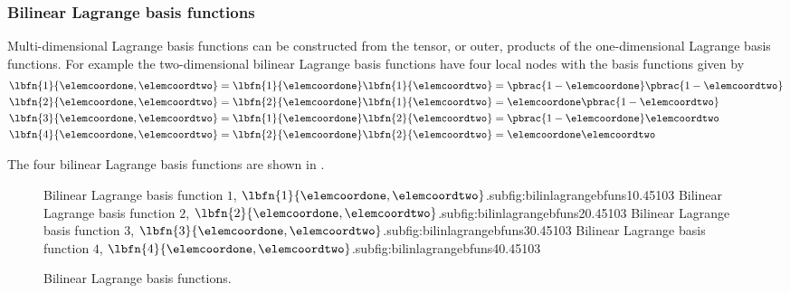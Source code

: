\subsubsection{Bilinear Lagrange basis functions}

Multi-dimensional Lagrange basis functions can be constructed from the tensor,
or outer, products of the one-dimensional Lagrange basis functions. For
example the two-dimensional bilinear Lagrange basis functions have four local
nodes with the basis functions given by
\begin{equation}
  \begin{split}
    \lbfn{1}{\elemcoordone,\elemcoordtwo}&=\lbfn{1}{\elemcoordone}\lbfn{1}{\elemcoordtwo}=
    \pbrac{1-\elemcoordone}\pbrac{1-\elemcoordtwo}\\
    \lbfn{2}{\elemcoordone,\elemcoordtwo}&=\lbfn{2}{\elemcoordone}\lbfn{1}{\elemcoordtwo}=
    \elemcoordone\pbrac{1-\elemcoordtwo}\\
    \lbfn{3}{\elemcoordone,\elemcoordtwo}&=\lbfn{1}{\elemcoordone}\lbfn{2}{\elemcoordtwo}=
    \pbrac{1-\elemcoordone}\elemcoordtwo \\
    \lbfn{4}{\elemcoordone,\elemcoordtwo}&=\lbfn{2}{\elemcoordone}\lbfn{2}{\elemcoordtwo}=
    \elemcoordone\elemcoordtwo
  \end{split}
\end{equation}

The four \twodal bilinear Lagrange basis functions are shown in .


\begin{figure}[hbtp]
   \centering
     {Bilinear Lagrange basis function $1$, $\lbfn{1}{\elemcoordone,\elemcoordtwo}$.}{subfig:bilinlagrangebfuns1}{0.45\linewidth}{10}{3}{}
   \hfil
     {Bilinear Lagrange basis function $2$, $\lbfn{2}{\elemcoordone,\elemcoordtwo}$.}{subfig:bilinlagrangebfuns2}{0.45\linewidth}{10}{3}{}
     {Bilinear Lagrange basis function $3$, $\lbfn{3}{\elemcoordone,\elemcoordtwo}$.}{subfig:bilinlagrangebfuns3}{0.45\linewidth}{10}{3}{}
   \hfil  
     {Bilinear Lagrange basis function $4$, $\lbfn{4}{\elemcoordone,\elemcoordtwo}$.}{subfig:bilinlagrangebfuns4}{0.45\linewidth}{10}{3}{}
   \caption[Bilinear Lagrange basis functions.]{Bilinear Lagrange basis functions.}
   \label{fig:bilinlagrangebfuns}
\end{figure}
            
